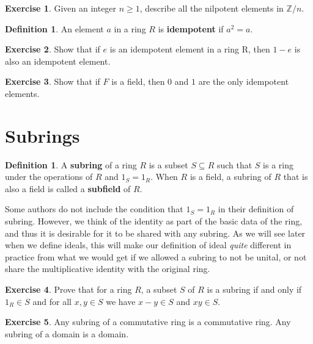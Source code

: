 \documentclass[12pt]{report}
\numberwithin{equation}{section}
\numberwithin{theorem}{chapter}
\theoremstyle{definition}
\newtheorem{definition}[theorem]{Definition}
\newtheorem{exercise}{Exercise}
\newtheorem*{basic properties}{Basic Properties}
\newtheorem*{Important Remark}{Important Remark}
\newcommand{\df}[1]{{\bf #1}\index{#1}}
\newcommand{\Z}{\mathbb{Z}}
\begin{document}
\begin{exercise}
	Given an integer $n \geqslant 1$, describe all the nilpotent elements in $\Z/n$.
\end{exercise}




\begin{definition}
An element $a$ in a ring $R$ is {\bf idempotent} if $a^2 = a$.
\end{definition}


\begin{exercise}
Show that if $e$ is an idempotent element in a ring R, then $1-e$ is also an idempotent element.
\end{exercise}

\begin{exercise}
	Show that if $F$ is a field, then $0$ and $1$ are the only idempotent elements.
\end{exercise}



\section{Subrings}


\begin{definition}\label{def:subring} 
A \df{subring} of a ring $R$ is a subset $S \subseteq R$ such that $S$ is a ring under the operations of $R$ and $1_S = 1_R$.
When $R$ is a field, a subring of $R$ that is also a field is called a \df{subfield} of $R$.
\end{definition}


Some authors do not include the condition that $1_S = 1_R$ in their definition of subring. However, we think of the identity as part of the basic data of the ring, and thus it is desirable for it to be shared with any subring. As we will see later when we define ideals, this will make our definition of ideal \emph{quite} different in practice from what we would get if we allowed a subring to not be unital, or not share the multiplicative identity with the original ring.

\begin{exercise}\label{subring test}
Prove that for a ring $R$, a subset $S$ of $R$ is a subring if and only if
  $1_R \in S$ and for all $x,y \in S$ we have $x-y \in S$ and $xy \in S$.
\end{exercise}




\begin{exercise}\label{subring commutative ring}
 Any subring of a commutative ring is a commutative ring. Any subring of a domain is  a domain.
 \end{exercise}
\end{document}
